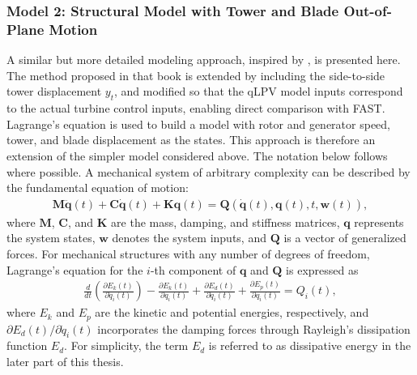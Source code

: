 \subsubsection{Model 2: Structural Model with Tower and Blade Out-of-Plane Motion} 
A similar but more detailed modeling approach, inspired by \cite{Bianchi2007}, is presented here. The method proposed in that book is extended by including the side-to-side tower displacement $y_t$, and modified so that the qLPV model inputs correspond to the actual turbine control inputs, enabling direct comparison with FAST. Lagrange's equation is used to build a model with rotor and generator speed, tower, and blade displacement as the states. This approach is therefore an extension of the simpler model considered above. The notation below follows \cite{Bianchi2007} where possible.
%
A mechanical system of arbitrary complexity can be described by the fundamental equation of motion:
\begin{align} \label{eqLagrange}
    \mathbf{M}\ddot{\bm{q}}(t) + \mathbf{C}\dot{\bm{q}}(t) + \mathbf{K}{\bm{q}}(t) = \mathbf{Q}(\dot{\bm{q}}(t), \bm{q}(t), t, \bm{w}(t)),
\end{align}
where $\mathbf{M}$, $\mathbf{C}$, and $\mathbf{K}$ are the mass, damping, and stiffness matrices, $\bm{q}$ represents the system states, $\bm{w}$ denotes the system inputs, and $\mathbf{Q}$ is a vector of generalized forces. For mechanical structures with any number of degrees of freedom, Lagrange's equation for the $i$-th component of \(\bm{q}\) and \(\mathbf{Q}\) is expressed as
\begin{align*}
    \frac{d}{dt} \left(\frac{\partial E_k(t)}{\partial \dot{q}_i(t)} \right) - \frac{\partial E_k(t)}{\partial q_i(t)} + \frac{\partial E_d(t)}{\partial \dot{q}_i(t)} + \frac{\partial E_p(t)}{\partial q_i(t)} = Q_i(t),
\end{align*}
where \(E_k\) and \(E_p\) are the kinetic and potential energies, respectively, and $\partial E_d(t)/\partial \dot{q}_i(t)$ incorporates the damping forces through Rayleigh's dissipation function $E_d$. For simplicity, the term $E_d$ is referred to as dissipative energy in the later part of this thesis. %
